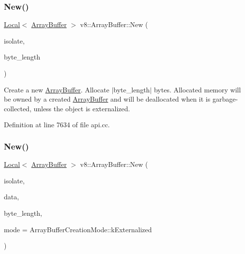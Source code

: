 \subsubsection{\texorpdfstring{New()}{New()}\hspace{0.1cm}{\footnotesize\ttfamily [1/2]}}
{\footnotesize\ttfamily \mbox{\hyperlink{classv8_1_1Local}{Local}}$<$ \mbox{\hyperlink{classv8_1_1ArrayBuffer}{Array\+Buffer}} $>$ v8\+::\+Array\+Buffer\+::\+New (\begin{DoxyParamCaption}\item[{Isolate $\ast$}]{isolate,  }\item[{\mbox{\hyperlink{classsize__t}{size\+\_\+t}}}]{byte\+\_\+length }\end{DoxyParamCaption})\hspace{0.3cm}{\ttfamily [static]}}

Create a new \mbox{\hyperlink{classv8_1_1ArrayBuffer}{Array\+Buffer}}. Allocate $\vert$byte\+\_\+length$\vert$ bytes. Allocated memory will be owned by a created \mbox{\hyperlink{classv8_1_1ArrayBuffer}{Array\+Buffer}} and will be deallocated when it is garbage-\/collected, unless the object is externalized. 

Definition at line 7634 of file api.\+cc.

\mbox{\label{classv8_1_1ArrayBuffer_a550a2293412cd72de8411354987bb31e}} 
\subsubsection{\texorpdfstring{New()}{New()}\hspace{0.1cm}{\footnotesize\ttfamily [2/2]}}
{\footnotesize\ttfamily \mbox{\hyperlink{classv8_1_1Local}{Local}}$<$ \mbox{\hyperlink{classv8_1_1ArrayBuffer}{Array\+Buffer}} $>$ v8\+::\+Array\+Buffer\+::\+New (\begin{DoxyParamCaption}\item[{Isolate $\ast$}]{isolate,  }\item[{void $\ast$}]{data,  }\item[{\mbox{\hyperlink{classsize__t}{size\+\_\+t}}}]{byte\+\_\+length,  }\item[{Array\+Buffer\+Creation\+Mode}]{mode = {\ttfamily ArrayBufferCreationMode\+:\+:kExternalized} }\end{DoxyParamCaption})\hspace{0.3cm}{\ttfamily [static]}}


